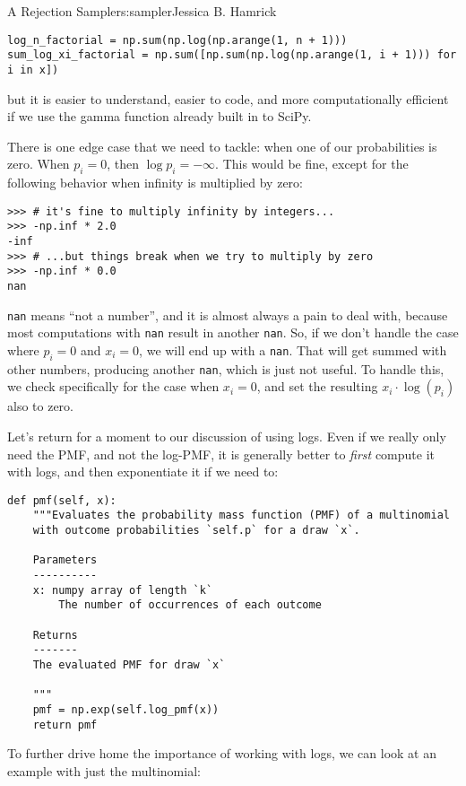 \begin{aosachapter}{A Rejection Sampler}{s:sampler}{Jessica B. Hamrick}
\begin{verbatim}
log_n_factorial = np.sum(np.log(np.arange(1, n + 1)))
sum_log_xi_factorial = np.sum([np.sum(np.log(np.arange(1, i + 1))) for i in x])
\end{verbatim}

but it is easier to understand, easier to code, and more computationally
efficient if we use the gamma function already built in to SciPy.

There is one edge case that we need to tackle: when one of our
probabilities is zero. When $p_i=0$, then $\log{p_i}=-\infty$. This
would be fine, except for the following behavior when infinity is
multiplied by zero:

\begin{verbatim}
>>> # it's fine to multiply infinity by integers...
>>> -np.inf * 2.0
-inf
>>> # ...but things break when we try to multiply by zero
>>> -np.inf * 0.0
nan
\end{verbatim}

\texttt{nan} means ``not a number'', and it is almost always a pain to
deal with, because most computations with \texttt{nan} result in another
\texttt{nan}. So, if we don't handle the case where $p_i=0$ and $x_i=0$,
we will end up with a \texttt{nan}. That will get summed with other
numbers, producing another \texttt{nan}, which is just not useful. To
handle this, we check specifically for the case when $x_i=0$, and set
the resulting $x_i\cdot{}\log(p_i)$ also to zero.

Let's return for a moment to our discussion of using logs. Even if we
really only need the PMF, and not the log-PMF, it is generally better to
\emph{first} compute it with logs, and then exponentiate it if we need
to:

\begin{verbatim}
def pmf(self, x):
    """Evaluates the probability mass function (PMF) of a multinomial
    with outcome probabilities `self.p` for a draw `x`.

    Parameters
    ----------
    x: numpy array of length `k`
        The number of occurrences of each outcome

    Returns
    -------
    The evaluated PMF for draw `x`

    """
    pmf = np.exp(self.log_pmf(x))
    return pmf
\end{verbatim}

To further drive home the importance of working with logs, we can look
at an example with just the multinomial:


\end{aosachapter}
